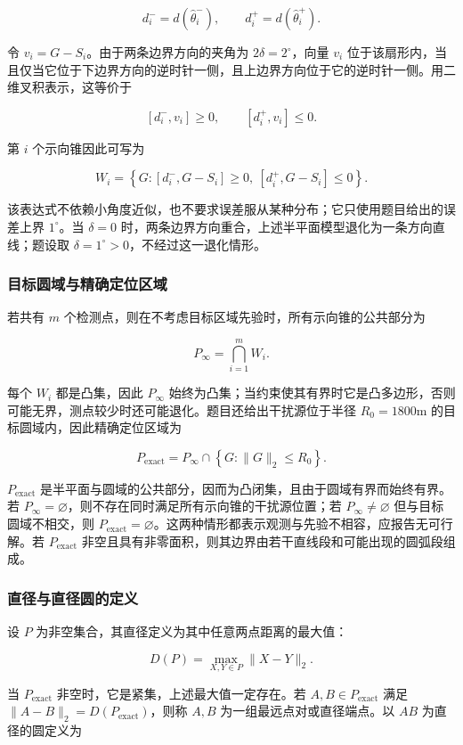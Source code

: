 \[
d_i^-=d(\hat\theta_i^-),\qquad d_i^+=d(\hat\theta_i^+).
\]

令 $v_i=G-S_i$。由于两条边界方向的夹角为 $2\delta=2^\circ$，向量 $v_i$ 位于该扇形内，当且仅当它位于下边界方向的逆时针一侧，且上边界方向位于它的逆时针一侧。用二维叉积表示，这等价于

\[
[d_i^-,v_i]\ge0,\qquad [d_i^+,v_i]\le0.
\]

第 $i$ 个示向锥因此可写为

\[
W_i=\left\{G:[d_i^-,G-S_i]\ge0,\ [d_i^+,G-S_i]\le0\right\}.
\]

该表达式不依赖小角度近似，也不要求误差服从某种分布；它只使用题目给出的误差上界 $1^\circ$。当 $\delta=0$ 时，两条边界方向重合，上述半平面模型退化为一条方向直线；题设取 $\delta=1^\circ>0$，不经过这一退化情形。

\subsubsection{目标圆域与精确定位区域}

若共有 $m$ 个检测点，则在不考虑目标区域先验时，所有示向锥的公共部分为

\[
P_\infty=\bigcap_{i=1}^{m}W_i.
\]

每个 $W_i$ 都是凸集，因此 $P_\infty$ 始终为凸集；当约束使其有界时它是凸多边形，否则可能无界，测点较少时还可能退化。题目还给出干扰源位于半径 $R_0=1800\mathrm{m}$ 的目标圆域内，因此精确定位区域为

\[
P_{\mathrm{exact}}
=
P_\infty\cap
\left\{G:\lVert G\rVert_2\le R_0\right\}.
\]

$P_{\mathrm{exact}}$ 是半平面与圆域的公共部分，因而为凸闭集，且由于圆域有界而始终有界。若 $P_\infty=\varnothing$，则不存在同时满足所有示向锥的干扰源位置；若 $P_\infty\ne\varnothing$ 但与目标圆域不相交，则 $P_{\mathrm{exact}}=\varnothing$。这两种情形都表示观测与先验不相容，应报告无可行解。若 $P_{\mathrm{exact}}$ 非空且具有非零面积，则其边界由若干直线段和可能出现的圆弧段组成。

\subsubsection{直径与直径圆的定义}

设 $P$ 为非空集合，其直径定义为其中任意两点距离的最大值：

\[
D(P)=\max_{X,Y\in P}\lVert X-Y\rVert_2.
\]

当 $P_{\mathrm{exact}}$ 非空时，它是紧集，上述最大值一定存在。若 $A,B\in P_{\mathrm{exact}}$ 满足 $\lVert A-B\rVert_2=D(P_{\mathrm{exact}})$，则称 $A,B$ 为一组最远点对或直径端点。以 $AB$ 为直径的圆定义为

